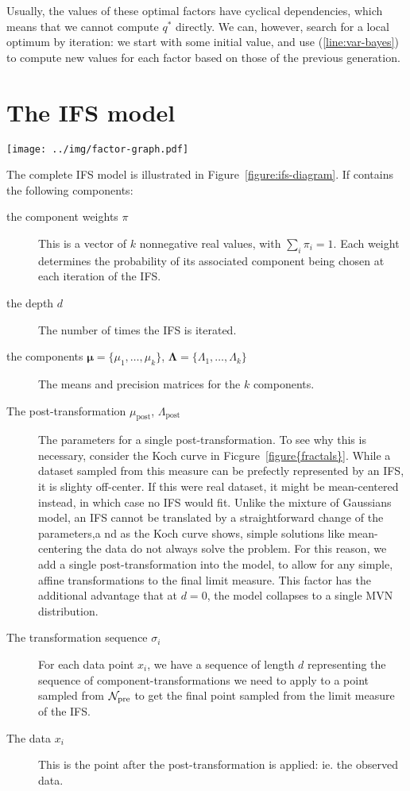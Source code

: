 \documentclass[10pt,a4paper,oneside]{article}
\theoremstyle{definition}
\newcommand{\bD}{\boldsymbol\Lambda}
\newcommand{\bm}{\boldsymbol\mu}
\newcommand{\cN}{{\cal N}}
\begin{document}
Usually, the values of these optimal factors have cyclical dependencies, which means that we cannot compute $q^*$ directly. We can, however, search for a local optimum by iteration: we start with some initial value, and use (\ref{line:var-bayes}) to compute new values for each factor based on those of the previous generation.  

\section{The IFS model}

\begin{figure*}[t]
  \texttt{[image: ../img/factor-graph.pdf]}
  \caption{A graphical model, illustrating the components of the IFS model. The gray box is a plate, representing a repetition of the nodes inside the box for each datapoint. The black node represents the observed data.}
  \label{figure:ifs-diagram}
\end{figure*}

The complete IFS model is illustrated in Figure~\ref{figure:ifs-diagram}. If contains the following components:
\begin{description}
\item[the component weights $\pi$] This is a vector of $k$ nonnegative real values, with $\sum_i \pi_i = 1$. Each weight determines the probability of its associated component being chosen at each iteration of the IFS.
\item[the depth $d$] The number of times the IFS is iterated.
\item[the components $\bm = \{\mu_1, \ldots, \mu_k\}$, $\bD = \{\Lambda_1, \ldots, \Lambda_k\}$] The means and precision matrices for the $k$ components. 
\item[The post-transformation $\mu_\text{post}$, $\Lambda_\text{post}$] The parameters for a single post-transformation. To see why this is necessary, consider the Koch curve in Ficgure~\ref{figure{fractals}}. While a dataset sampled from this measure can be prefectly represented by an IFS, it is slighty off-center. If this were real dataset, it might be mean-centered instead, in which case no IFS would fit. Unlike the mixture of Gaussians model, an IFS cannot be translated by a straightforward change of the parameters,a nd as the Koch curve shows, simple solutions like mean-centering the data do not always solve the problem. For this reason, we add a single post-transformation into the model, to allow for any simple, affine transformations to the final limit measure. This factor has the additional advantage that at $d = 0$, the model collapses to a single MVN distribution.
\item[The transformation sequence $\sigma_i$] For each data point $x_i$, we have a sequence of length $d$ representing the sequence of component-transformations we need to apply to a point sampled from $\cN_\text{pre}$ to get the final point sampled from the limit measure of the IFS. 
\item[The data $x_i$] This is the point after the post-transformation is applied: ie. the observed data.
\end{description}
\end{document}
